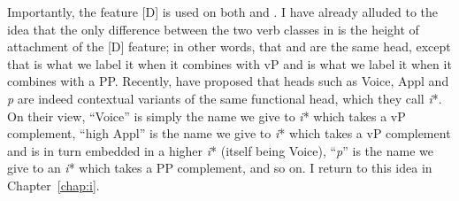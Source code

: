 \begin{exe}
\begin{xlist}
\begin{xlist}
\begin{exe}
\begin{xlist}
\begin{xlist}
\begin{exe}
\begin{xlist}
\begin{xlist}
\begin{exe}
\begin{exe}
\begin{xlist}
\begin{exe}
\begin{exe}
\begin{xlist}
\begin{exe}
\begin{exe}
\begin{exe}
\begin{exe}
\begin{exe}
\begin{xlist}
\begin{exe}
\begin{xlist}
\begin{exe}
\begin{exe}
\begin{xlist}
\begin{exe}
\begin{xlist}
\begin{exe}
\begin{xlist}
\begin{exe}
\begin{exe}
\begin{exe}
\begin{xlist}
\begin{exe}
\begin{exe}
\begin{exe}
\begin{xlist}
\begin{exe}
\begin{xlist}
\begin{exe}
\begin{exe}
\begin{xlist}
\begin{exe}
\begin{exe}
\begin{exe}
\begin{exe}
\begin{xlist}
\begin{exe}
\begin{xlist}
\begin{exe}
\begin{xlist}
\begin{exe}
\begin{xlist}
\begin{exe}
\begin{xlist}
\begin{exe}
\begin{xlist}
\begin{exe}
\begin{exe}
\begin{xlist}
\begin{exe}
\begin{xlist}
\begin{exe}
\begin{exe}
\begin{xlist}
Importantly, the feature [\textminus{}D] is used on both {\vz} and {\pz}. I have already alluded to the idea that the only difference between the two verb classes in {\tnif} is the height of attachment of the [\textminus{}D] feature; in other words, that {\vz} and {\pz} are the same head, except that {\vz} is what we label it when it combines with vP and {\pz} is what we label it when it combines with a PP. Recently, \cite{woodmarantz17} have proposed that heads such as Voice, Appl and \emph{p} are indeed contextual variants of the same functional head, which they call \emph{i}*. On their view, ``Voice'' is simply the name we give to \emph{i}* which takes a vP complement, ``high Appl'' is the name we give to \emph{i}* which takes a vP complement and is in turn embedded in a higher \emph{i}* (itself being Voice), ``\emph{p}'' is the name we give to an \emph{i}* which takes a PP complement, and so on. I return to this idea in Chapter~\ref{chap:i}.


\end{xlist}
\end{exe}
\end{exe}
\end{xlist}
\end{exe}
\end{xlist}
\end{exe}
\end{exe}
\end{xlist}
\end{exe}
\end{xlist}
\end{exe}
\end{xlist}
\end{exe}
\end{xlist}
\end{exe}
\end{xlist}
\end{exe}
\end{xlist}
\end{exe}
\end{exe}
\end{exe}
\end{exe}
\end{xlist}
\end{exe}
\end{exe}
\end{xlist}
\end{exe}
\end{xlist}
\end{exe}
\end{exe}
\end{exe}
\end{xlist}
\end{exe}
\end{exe}
\end{exe}
\end{xlist}
\end{exe}
\end{xlist}
\end{exe}
\end{xlist}
\end{exe}
\end{exe}
\end{xlist}
\end{exe}
\end{xlist}
\end{exe}
\end{exe}
\end{exe}
\end{exe}
\end{exe}
\end{xlist}
\end{exe}
\end{exe}
\end{xlist}
\end{exe}
\end{exe}
\end{xlist}
\end{xlist}
\end{exe}
\end{xlist}
\end{xlist}
\end{exe}
\end{xlist}
\end{xlist}
\end{exe}
